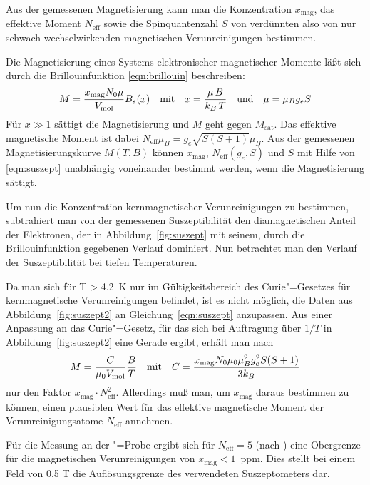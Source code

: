 Aus der gemessenen Magnetisierung kann man die Konzentration $x_\mathrm{mag}$, das effektive Moment
$N_\mathrm{eff}$ sowie die Spinquantenzahl $S$ von verdünnten also von nur schwach
wechselwirkenden magnetischen Verunreinigungen bestimmen.

Die Magnetisierung eines Systems elektronischer magnetischer Momente läßt sich durch die
Brillouinfunktion \eqref{eqn:brillouin} beschreiben:
	\begin{equation}
		\label{eqn:suszept}
		M = \frac{x_\mathrm{mag}N_0\mu}{V_\mathrm{mol}}B_s(x)\quad\text{mit}\quad
			x=\frac{\mu\,B}{k_B\,T}\quad\text{und}\quad\mu=\mu_Bg_eS
	\end{equation} 
Für $x\gg1$ sättigt die Magnetisierung und $M$ geht gegen $M_\mathrm{sat}$. Das effektive magnetische Moment
ist dabei $N_\mathrm{eff}\mu_B=g_e\sqrt{S(S+1)}\mu_B$. Aus der gemessenen Magnetisierungskurve
$M(T,B)$ können $x_\mathrm{mag}$, $N_\mathrm{eff}(g_e,S)$ und $S$ mit Hilfe von \eqref{eqn:suszept}
unabhängig voneinander bestimmt werden, wenn die Magnetisierung sättigt.


Um nun die Konzentration kernmagnetischer Verunreinigungen zu bestimmen, subtrahiert man von der
gemessenen Suszeptibilität den diamagnetischen Anteil der Elektronen, der in
Abbildung~\ref{fig:suszept} mit seinem, durch die Brillouinfunktion gegebenen Verlauf dominiert.
Nun betrachtet man den Verlauf der Suszeptibilität bei tiefen Temperaturen.

Da man sich für T > 4.2~K nur im Gültigkeitsbereich des Curie"=Gesetzes für kernmagnetische Verunreinigungen
befindet, ist es nicht möglich, die Daten aus Abbildung~\ref{fig:suszept2} an
Gleichung~\eqref{eqn:suszept} anzupassen. Aus einer Anpassung an das Curie"=Gesetz, für das sich bei
Auftragung über $1/T$ in Abbildung~\ref{fig:suszept2} eine Gerade ergibt, erhält man nach
	\begin{equation}
		\label{eqn:suszept2}
		M = \frac{C}{\mu_0V_\mathrm{mol}}\frac{B}{T} \quad\text{mit}\quad
			C=\frac{x_\mathrm{mag}N_0\mu_0\mu_B^2g_e^2S(S+1)}{3k_B}
	\end{equation}
nur den Faktor $x_\mathrm{mag}\cdot N_\mathrm{eff}^2$. Allerdings muß man, um $x_\mathrm{mag}$
daraus bestimmen zu können, einen plausiblen Wert für das effektive magnetische Moment der
Verunreinigungsatome $N_\mathrm{eff}$ annehmen.

Für die Messung an der \aug"=Probe ergibt sich für $N_\mathrm{eff}=5$ (nach \cite{Doofi}) eine Obergrenze
für die magnetischen Verunreinigungen von $x_\mathrm{mag}< 1$~ppm. Dies stellt bei einem
Feld von 0.5 T die Auflösungsgrenze des verwendeten Suszeptometers dar. 

